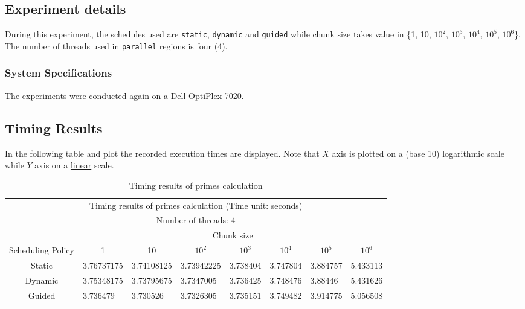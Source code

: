 \documentclass{article}
\def\code#1{\texttt{#1}}
\begin{document}
\subsection{Experiment details}
During this experiment, the schedules used are \code{static}, \code{dynamic} and \code{guided}
while chunk size takes value in \{1, 10, $10^2$, $10^3$, $10^4$, $10^5$, $10^6$\}. The number
of threads used in \code{parallel} regions is four (4).

\subsubsection{System Specifications}
The experiments were conducted again on a Dell OptiPlex 7020.


\subsection{Timing Results}
In the following table and plot the recorded execution times are displayed.
Note that $X$ axis is plotted on a (base 10) \underline{logarithmic} scale while
$Y$ axis on a \underline{linear} scale.

\begin{table}[htbp]
  \centering
    \begin{tabular}{|c||l|l|l|l|l|l|l|} 
    \hline
    \multicolumn{8}{|c|}{Timing results of primes calculation (Time unit: seconds)} \\
    \multicolumn{8}{|c|}{Number of threads: 4} \\
    \hline
    & \multicolumn{7}{|c|}{Chunk size} \\
    \hline
    Scheduling Policy  & \multicolumn{1}{|c|}{1} & \multicolumn{1}{|c|}{10} & \multicolumn{1}{|c|}{$10^2$} 
    & \multicolumn{1}{|c|}{$10^3$} & \multicolumn{1}{|c|}{$10^4$} & \multicolumn{1}{|c|}{$10^5$} 
    & \multicolumn{1}{|c|}{$10^6$}\\
    \hline\hline
    Static & 3.76737175 & 3.74108125 & 3.73942225 & 3.738404 & 3.747804 & 3.884757 & 5.433113 \\
    \hline
    Dynamic & 3.75348175 & 3.73795675 & 3.7347005 & 3.736425 & 3.748476 & 3.88446 & 5.431626 \\
    \hline
    Guided &  3.736479 & 3.730526 & 3.7326305 & 3.735151 & 3.749482 & 3.914775 & 5.056508 \\ [1ex]
    \hline
    \end{tabular}
  \caption{Timing results of primes calculation}
\end{table}
\end{document}
